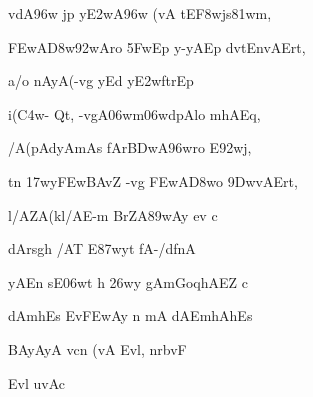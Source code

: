 {\dn v\?dA\2\396w jp y\3E2wA\2\396w (vA tE\3F8wjs\381wm, \vegdn\dontdisplaylinenum}

{\dn \3FEwA\3D8w\392wAro \35FwEp y-yAEp d\?vt\4En\0vAErt,{\dandabdn} \dontdisplaylinenum}

{\dn a/o nAyA(-vg{\rdt} yEd y\3E2wft\4rEp \vegdn\dontdisplaylinenum}

{\dn i(\3C4w- Qt, -vgA\0\306wm\306wdpAlo mhAEq,{\dandabdn} \dontdisplaylinenum}

{\dn {}/A(pAdyAmAs fAr\3BDwA\396wro E\392wj, \vegdn\dontdisplaylinenum}

{\dn t\?n \317wy\3FEwBAv\?Z -vg{\rdt} \3FEwA\3D8wo \39DwvAErt,{\dandabdn} \dontdisplaylinenum}

{\dn {}l/AZA(kl/AE-m BrZA\389wAy\0 ev c \vegdn\dontdisplaylinenum}

{\dn dArs\2g\5h /AT\?{\qvb} E\387wyt\? fA-/df\0nA \dontdisplaylinenum}

{\dn yAEn sE\306wt h\? \326wy\2 g\5AmGoqhAEZ c \vegdn\dontdisplaylinenum}

{\dn dAmh\0Es Ev\3FEwAy n mA\2 dAEmhAh\0Es{\dandabdn} \dontdisplaylinenum}

{\dn BAyA\0yA vcn\2 (vA Evl, nrb\5vF \vegdn\dontdisplaylinenum}

{\dn Evl uvAc{\dandabdn}\dontdisplaylinenum }

